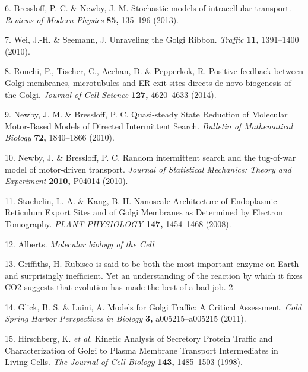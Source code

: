 \documentclass[12pt,a4paper,]{Dissertate}
\begin{document}
\leavevmode\hypertarget{ref-bressloff_stochastic_2013}{}%
6. Bressloff, P. C. \& Newby, J. M. Stochastic models of intracellular
transport. \emph{Reviews of Modern Physics} \textbf{85,} 135--196
(2013).

\leavevmode\hypertarget{ref-wei_unraveling_2010}{}%
7. Wei, J.-H. \& Seemann, J. Unraveling the Golgi Ribbon. \emph{Traffic}
\textbf{11,} 1391--1400 (2010).

\leavevmode\hypertarget{ref-ronchi_positive_2014}{}%
8. Ronchi, P., Tischer, C., Acehan, D. \& Pepperkok, R. Positive
feedback between Golgi membranes, microtubules and ER exit sites directs
de novo biogenesis of the Golgi. \emph{Journal of Cell Science}
\textbf{127,} 4620--4633 (2014).

\leavevmode\hypertarget{ref-newby_quasi-steady_2010}{}%
9. Newby, J. M. \& Bressloff, P. C. Quasi-steady State Reduction of
Molecular Motor-Based Models of Directed Intermittent Search.
\emph{Bulletin of Mathematical Biology} \textbf{72,} 1840--1866 (2010).

\leavevmode\hypertarget{ref-newby_random_2010}{}%
10. Newby, J. \& Bressloff, P. C. Random intermittent search and the
tug-of-war model of motor-driven transport. \emph{Journal of Statistical
Mechanics: Theory and Experiment} \textbf{2010,} P04014 (2010).

\leavevmode\hypertarget{ref-staehelin_nanoscale_2008}{}%
11. Staehelin, L. A. \& Kang, B.-H. Nanoscale Architecture of
Endoplasmic Reticulum Export Sites and of Golgi Membranes as Determined
by Electron Tomography. \emph{PLANT PHYSIOLOGY} \textbf{147,} 1454--1468
(2008).

\leavevmode\hypertarget{ref-alberts_molecular_nodate}{}%
12. Alberts. \emph{Molecular biology of the Cell}.

\leavevmode\hypertarget{ref-griffiths_rubisco_nodate}{}%
13. Griffiths, H. Rubisco is said to be both the most important enzyme
on Earth and surprisingly inefficient. Yet an understanding of the
reaction by which it fixes CO2 suggests that evolution has made the best
of a bad job. 2

\leavevmode\hypertarget{ref-glick_models_2011}{}%
14. Glick, B. S. \& Luini, A. Models for Golgi Traffic: A Critical
Assessment. \emph{Cold Spring Harbor Perspectives in Biology}
\textbf{3,} a005215--a005215 (2011).

\leavevmode\hypertarget{ref-hirschberg_kinetic_1998}{}%
15. Hirschberg, K. \emph{et al.} Kinetic Analysis of Secretory Protein
Traffic and Characterization of Golgi to Plasma Membrane Transport
Intermediates in Living Cells. \emph{The Journal of Cell Biology}
\textbf{143,} 1485--1503 (1998).
\end{document}
